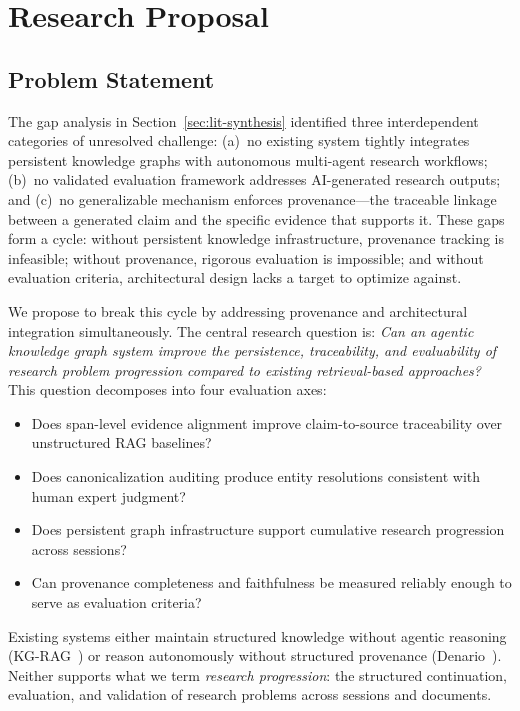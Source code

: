 \section{Research Proposal}
\label{sec:proposal}

\subsection{Problem Statement}
\label{sec:proposal-problem}

The gap analysis in Section~\ref{sec:lit-synthesis} identified three interdependent categories of unresolved challenge: (a)~no existing system tightly integrates persistent knowledge graphs with autonomous multi-agent research workflows; (b)~no validated evaluation framework addresses AI-generated research outputs; and (c)~no generalizable mechanism enforces provenance---the traceable linkage between a generated claim and the specific evidence that supports it. These gaps form a cycle: without persistent knowledge infrastructure, provenance tracking is infeasible; without provenance, rigorous evaluation is impossible; and without evaluation criteria, architectural design lacks a target to optimize against.

We propose to break this cycle by addressing provenance and architectural integration simultaneously. The central research question is: \emph{Can an agentic knowledge graph system improve the persistence, traceability, and evaluability of research problem progression compared to existing retrieval-based approaches?} This question decomposes into four evaluation axes:
\begin{itemize}
\item[\textbf{E1}] Does span-level evidence alignment improve claim-to-source traceability over unstructured RAG baselines?
\item[\textbf{E2}] Does canonicalization auditing produce entity resolutions consistent with human expert judgment?
\item[\textbf{E3}] Does persistent graph infrastructure support cumulative research progression across sessions?
\item[\textbf{E4}] Can provenance completeness and faithfulness be measured reliably enough to serve as evaluation criteria?
\end{itemize}
Existing systems either maintain structured knowledge without agentic reasoning (KG-RAG~\cite{suryawanshi2025kgrag}) or reason autonomously without structured provenance (Denario~\cite{villaescusa2025denario}). Neither supports what we term \emph{research progression}: the structured continuation, evaluation, and validation of research problems across sessions and documents.

